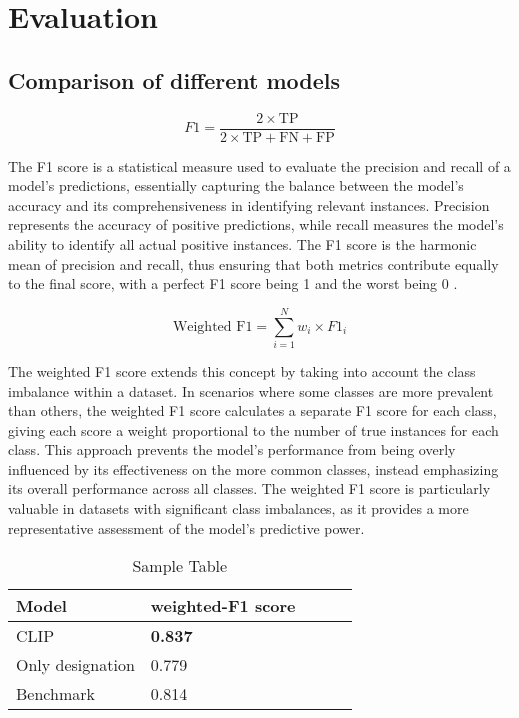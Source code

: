 \chapter{Evaluation}
\label{sec:evaluation}
\section{Comparison of different models} 

\begin{equation}
	F1 = \frac{2 \times \text{TP}}{2 \times \text{TP} + \text{FN} + \text{FP}}
\end{equation}

The F1 score is a statistical measure used to evaluate the precision and recall of a model's predictions, essentially capturing the balance between the model's accuracy and its comprehensiveness in identifying relevant instances. Precision represents the accuracy of positive predictions, while recall measures the model's ability to identify all actual positive instances. The F1 score is the harmonic mean of precision and recall, thus ensuring that both metrics contribute equally to the final score, with a perfect F1 score being 1 and the worst being 0 \cite{chicco-2020}.

\begin{equation}
	\text{Weighted F1} = \sum_{i=1}^{N} w_i \times F1_i
\end{equation}

The weighted F1 score extends this concept by taking into account the class imbalance within a dataset. In scenarios where some classes are more prevalent than others, the weighted F1 score calculates a separate F1 score for each class, giving each score a weight proportional to the number of true instances for each class. This approach prevents the model's performance from being overly influenced by its effectiveness on the more common classes, instead emphasizing its overall performance across all classes. The weighted F1 score is particularly valuable in datasets with significant class imbalances, as it provides a more representative assessment of the model's predictive power.

\begin{table}[h]
	\centering
	\begin{tabular}{|l|l|l|l|l|}
		\hline
		Model & weighted-F1 score  \\ \hline
		CLIP & \textbf{0.837}  \\ 
		Only designation & 0.779  \\ 
		Benchmark &  0.814  \\  
		\hline
	\end{tabular}
	\caption{Sample Table}
	\label{tab:my_label}
\end{table}


